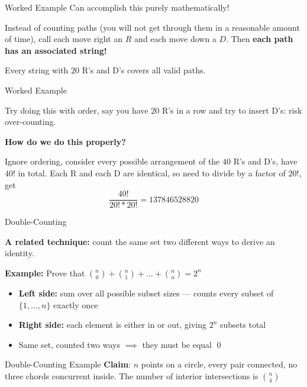 \documentclass{beamer}
\begin{document}
\begin{frame}{Worked Example}
    Can accomplish this purely mathematically!

    Instead of counting paths (you will not get through them in a reasonable amount of time), call each move right an $R$ and each move down a $D$. Then \textbf{each path has an associated string!}

    Every string with $20$ R's and D's covers all valid paths.
\end{frame}

\begin{frame}{Worked Example}
    
    Try doing this with order, say you have $20$ R's in a row and try to insert D's: risk over-counting.

    \textbf{How do we do this properly?}

    Ignore ordering, consider every possible arrangement of the $40$ R's and D's, have $40!$ in total. Each R and each D are identical, so need to divide by a factor of $20!$, get $$\frac{40!}{20! *20!} = 137846528820$$
\end{frame}

\begin{frame}{Double-Counting}
    
   \textbf{A related technique:} count the same set two different ways to derive an identity.

    \textbf{Example:} Prove that $\binom{n}{0} + \binom{n}{1} + \dots + \binom{n}{n} = 2^n$
    
    \begin{itemize}
        \item \textbf{Left side:} sum over all possible subset sizes --- counts every subset of $\{1, \dots, n\}$ exactly once
        \item \textbf{Right side:} each element is either in or out, giving $2^n$ subsets total
        \item Same set, counted two ways $\implies$ they must be equal \qed
    \end{itemize}
\end{frame}

\begin{frame}{Double-Counting Example}
    \textbf{Claim}: $n$ points on a circle, every pair connected, no three chords concurrent inside. The number of interior intersections is $\binom{n}{4}$
\end{frame}
\end{document}
